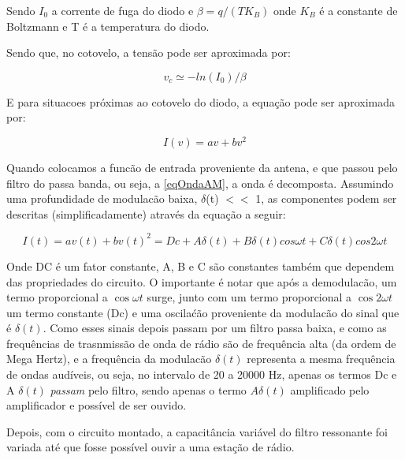 \documentclass[11pt,a4paper]{article}
\begin{document}
    Sendo $I_0$ a corrente de fuga do diodo e $\beta = q/(TK_B)$ onde $K_B$ é a constante de Boltzmann e T é a temperatura do diodo.
    
    Sendo que, no cotovelo, a tensão pode ser aproximada por:
    
        \begin{equation}
            v_c \simeq -ln(I_0)/\beta
            \label{vc}
        \end{equation}
    
    E para situacoes próximas ao cotovelo do diodo, a equação pode ser aproximada por:
    
        \begin{equation}
            I(v) = av + bv^2
            \label{eqDiodoCotovelo}
        \end{equation}
    
    
    
    Quando colocamos a funcão de entrada proveniente da antena, e que passou pelo filtro do passa banda, ou seja, a \cref{eqOndaAM}, a onda é decomposta. Assumindo uma profundidade de modulacão baixa, $\delta$(t) $<<$ 1, as componentes podem ser descritas (simplificadamente) através da equação a seguir: 
    
        \begin{equation}
            I(t) = av(t) + bv(t) ^2 = Dc + A \delta (t)+B\delta (t)cos\omega t + C \delta(t) cos2\omega t
            \label{eqdecodificado}
        \end{equation}
        
    Onde DC é um fator constante, A, B e C são constantes também que dependem das propriedades do circuito. O importante é notar que após a demodulacão, um termo proporcional a $\cos\omega t$ surge, junto com um termo proporcional a $\cos2\omega t$ um termo constante (Dc) e uma oscilaćão proveniente da modulacão do sinal que é $\delta(t)$. Como esses sinais depois passam por um filtro passa baixa, e como as frequências de trasnmissão de onda de rádio são de frequência alta (da ordem de Mega Hertz), e a frequência da modulacão $\delta (t)$ representa a mesma frequência de ondas audíveis, ou seja, no intervalo de 20 a 20000 Hz,  apenas os termos Dc e A $\delta (t)$ \textit{passam} pelo filtro, sendo apenas o termo $A\delta (t)$ amplificado pelo amplificador e possível de ser ouvido.
    
    Depois, com o circuito montado, a capacitância variável do filtro ressonante foi variada até que fosse possível ouvir a  uma estação de rádio.
    
\end{document}
